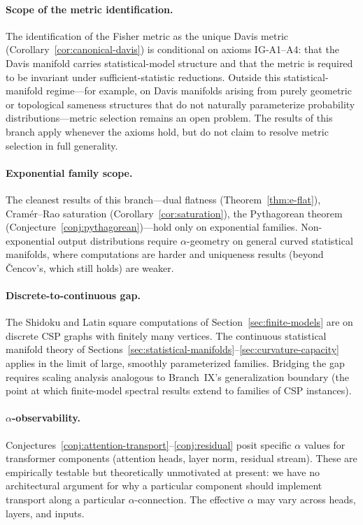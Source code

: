 \documentclass[11pt]{article}
\theoremstyle{remark}
\begin{document}
\paragraph{Scope of the metric identification.}
The identification of the Fisher metric as the unique Davis metric
(Corollary~\ref{cor:canonical-davis}) is conditional on axioms IG-A1--A4:
that the Davis manifold carries statistical-model structure and that the
metric is required to be invariant under sufficient-statistic reductions.
Outside this statistical-manifold regime---for example, on Davis manifolds
arising from purely geometric or topological sameness structures that do not
naturally parameterize probability distributions---metric selection remains
an open problem.  The results of this branch apply whenever the axioms hold,
but do not claim to resolve metric selection in full generality.

\paragraph{Exponential family scope.}
The cleanest results of this branch---dual flatness
(Theorem~\ref{thm:e-flat}), Cram\'er--Rao saturation
(Corollary~\ref{cor:saturation}), the Pythagorean theorem
(Conjecture~\ref{conj:pythagorean})---hold only on exponential families.
Non-exponential output distributions require $\alpha$-geometry on general
curved statistical manifolds, where computations are harder and uniqueness
results (beyond \v{C}encov's, which still holds) are weaker.

\paragraph{Discrete-to-continuous gap.}
The Shidoku and Latin square computations of Section~\ref{sec:finite-models}
are on discrete CSP graphs with finitely many vertices.  The continuous
statistical manifold theory of Sections~\ref{sec:statistical-manifolds}--\ref{sec:curvature-capacity} applies in the limit of large, smoothly
parameterized families.  Bridging the gap requires scaling analysis analogous
to Branch~IX's generalization boundary (the point at which finite-model
spectral results extend to families of CSP instances).

\paragraph{$\alpha$-observability.}
Conjectures~\ref{conj:attention-transport}--\ref{conj:residual} posit specific
$\alpha$ values for transformer components (attention heads, layer norm,
residual stream).  These are empirically testable but theoretically
unmotivated at present: we have no architectural argument for why a particular
component should implement transport along a particular $\alpha$-connection.
The effective $\alpha$ may vary across heads, layers, and inputs.
\end{document}
